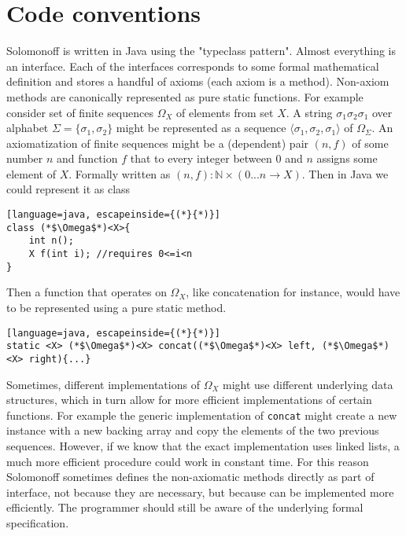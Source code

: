 \documentclass[12pt]{article}
\begin{document}
 \section{Code conventions}

Solomonoff is written in Java using the "typeclass pattern". Almost everything is an interface. Each of the interfaces corresponds to some formal mathematical definition and stores a handful of axioms (each axiom is a method). Non-axiom methods are canonically represented as pure static functions. 
For example consider set of finite sequences $\Omega_X$ of elements from set $X$. A string $\sigma_1\sigma_2\sigma_1$ over alphabet $\Sigma=\{\sigma_1,\sigma_2\}$ might be represented as a sequence $\langle \sigma_1,\sigma_2,\sigma_1\rangle$ of $\Omega_\Sigma$. An axiomatization of finite sequences might be a (dependent) pair $(n, f)$ of some number $n$ and function $f$ that to every integer between $0$ and $n$ assigns some element of $X$. Formally written as $(n, f) : \mathbb{N} \times (0...n \rightarrow X)$. Then in Java we could represent it as class
\begin{lstlisting}[language=java, escapeinside={(*}{*)}]
class (*$\Omega$*)<X>{
    int n();
    X f(int i); //requires 0<=i<n
}
\end{lstlisting}
Then a function that operates on $\Omega_X$, like concatenation for instance, would have to be represented using a pure static method.
\begin{lstlisting}[language=java, escapeinside={(*}{*)}]
static <X> (*$\Omega$*)<X> concat((*$\Omega$*)<X> left, (*$\Omega$*)<X> right){...}
\end{lstlisting}
Sometimes, different implementations of $\Omega_X$ might use different underlying data structures, which in turn allow for more efficient implementations of certain functions. For example the generic implementation of \texttt{concat} might create a new instance with a new backing array and copy the elements of the two previous sequences. However, if we know that the exact implementation uses linked lists, a much more efficient procedure could work in constant time.  For this reason Solomonoff sometimes defines the non-axiomatic methods directly as part of interface, not because they are necessary, but because can be implemented more efficiently. The programmer should still be aware of the underlying formal specification. 
\end{document}
